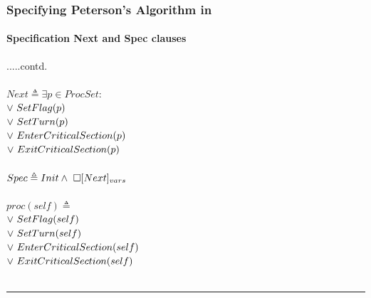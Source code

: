\documentclass[xcolor=dvipsnames]{beamer}
\begin{document}
\begin{frame}
	\frametitle{Specifying Peterson's Algorithm in \tla}
	\framesubtitle{Specification Next and Spec clauses}
	\fontsize{8}{7.2}\selectfont
	
	.....contd. \\~\\
	$Next \triangleq \exists p \in ProcSet:$\\
	\hspace*{0.8cm}$ \lor \  SetFlag(p)$\\
	\hspace*{0.8cm}$ \lor \  SetTurn(p)$\\
	\hspace*{0.8cm}$ \lor \  EnterCriticalSection(p)$\\
	\hspace*{0.8cm}$ \lor \  ExitCriticalSection(p)$\\~\\
	$Spec \triangleq Init \land \  \square [Next]_{vars}$\\~\\
	$proc(self) \triangleq$\\
	\hspace*{0.8cm}$ \lor \  SetFlag(self)$\\
	\hspace*{0.8cm}$ \lor \  SetTurn(self)$\\
	\hspace*{0.8cm}$ \lor \  EnterCriticalSection(self)$\\
	\hspace*{0.8cm}$ \lor \  ExitCriticalSection(self)$\\~\\
	\hrule
	
\end{frame}
\end{document}
